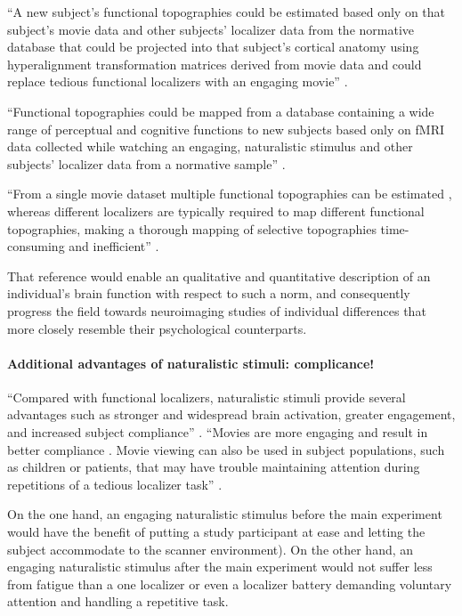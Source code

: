 %
``A new subject's functional topographies could be estimated based only on that
subject's movie data and other subjects' localizer data from the normative
database that could be projected into that subject's cortical anatomy using
hyperalignment transformation matrices derived from movie data and could replace
tedious functional localizers with an engaging movie''
\citep{jiahui2020predicting}.

%
``Functional topographies could be mapped from a database containing a wide
range of perceptual and cognitive functions to new subjects based only on fMRI
data collected while watching an engaging, naturalistic stimulus and other
subjects' localizer data from a normative sample'' \citep{jiahui2020predicting}.

``From a single movie dataset multiple functional topographies can be estimated
\citep{guntupalli2016model}, whereas different localizers are typically required
to map different functional topographies, making a thorough mapping of selective
topographies time-consuming and inefficient'' \citep{jiahui2020predicting}.

%
That reference would enable an qualitative and quantitative description of an
individual's brain function with respect to such a norm, and consequently
progress the field towards neuroimaging studies of individual differences that
more closely resemble their psychological counterparts.





\paragraph{Additional advantages of naturalistic stimuli: complicance!}
%
``Compared with functional localizers, naturalistic stimuli provide several
advantages such as stronger and widespread brain activation, greater engagement,
and increased subject compliance'' \citep{jiahui2020predicting}.
%
``Movies are more engaging and result in better compliance
\citep{vanderwal2015inscapes}.
%
Movie viewing can also be used in subject populations, such as children
\citep{richardson2018development} or patients, that may have trouble maintaining
attention during repetitions of a tedious localizer task''
\citep{jiahui2020predicting}.

%
On the one hand, an engaging naturalistic stimulus before the main experiment
would have the benefit of putting a study participant at ease and letting the
subject accommodate to the scanner environment).
%
On the other hand, an engaging naturalistic stimulus after the main experiment
would not suffer less from fatigue than a one localizer or even a localizer
battery demanding voluntary attention and handling a repetitive task.




